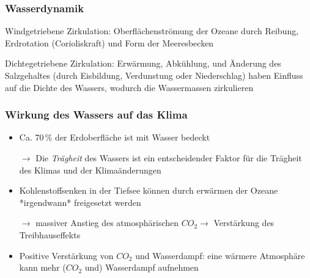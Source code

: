 \begin{frame}
	\frametitle{Wasserdynamik} %
	\begin{block}{Windgetriebene Zirkulation: } %
		Oberflächenströmung der Ozeane durch Reibung, Erdrotation (Corioliskraft) und Form der Meeresbecken 
	\end{block}
	\begin{block}{Dichtegetriebene Zirkulation: }  %
		Erwärmung, Abkühlung, und Änderung des Salzgehaltes (durch Eisbildung, Verdunstung oder Niederschlag) haben Einfluss auf die Dichte des Wassers, wodurch die Wassermassen zirkulieren
	\end{block}
	
\end{frame}


\begin{frame}
	\frametitle{Wirkung des Wassers auf das Klima}
	\begin{itemize}
	\item Ca. 70\,\% der Erdoberfläche ist mit Wasser bedeckt
	\item [$\rightarrow$] Die \textit{Trägheit} des Wassers ist ein entscheidender Faktor für die Trägheit des Klimas und der Klimaänderungen %
	\item Kohlenstoffsenken in der Tiefsee können durch erwärmen der Ozeane *irgendwann* freigesetzt werden
	\item[$\rightarrow$] massiver Anstieg des atmosphärischen $CO_2 \rightarrow$ Verstärkung des Treibhauseffekts
	\item Positive Verstärkung von $CO_2$ und Wasserdampf: eine wärmere Atmosphäre kann mehr ($CO_2$ und) Wasserdampf aufnehmen
	\end{itemize}
\end{frame}


